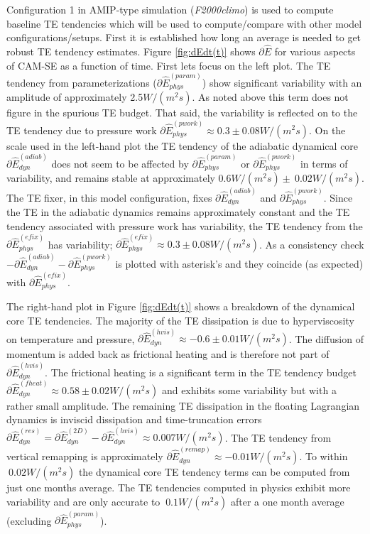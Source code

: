\documentclass{agujournal}
\newcommand*{\gi}[1]{\widehat{#1}}
\begin{document}
Configuration 1 in AMIP-type simulation ({\em{F2000climo}}) is used to compute baseline TE tendencies which will be used to compute/compare with other model configurations/setups. First it is established how long an average is needed to get robust TE tendency estimates. Figure \ref{fig:dEdt(t)} shows $\partial \gi{E}$ for various aspects of CAM-SE as a function of time. First lets focus on the left plot. The TE tendency from parameterizations ($\partial \gi{E}^{(param)}_{phys}$) show significant variability with an amplitude of approximately 2.5$W/(m^2s)$. As noted above this term does not figure in the spurious TE budget. That said, the variability is reflected on to the TE tendency due to pressure work $\partial \gi{E}^{(pwork)}_{phys}\approx 0.3\pm 0.08 W/(m^2s)$. On the scale used in the left-hand plot the TE tendency of the adiabatic dynamical core $\partial \gi{E}^{(adiab)}_{dyn}$ does not seem to be affected by $\partial \gi{E}^{(param)}_{phys}$ or $\partial \gi{E}^{(pwork)}_{phys}$ in terms of variability, and remains stable at approximately 0.6$W/(m^2s)\pm ~0.02 W/(m^2s)$. The TE fixer, in this model configuration, fixes $\partial \gi{E}^{(adiab)}_{dyn}$ and $\partial \gi{E}^{(pwork)}_{phys}$. Since the TE in the adiabatic dynamics remains approximately constant and the TE tendency associated with pressure work has variability, the TE tendency from the $\partial \gi{E}^{(efix)}_{phys}$ has variability; $\partial \gi{E}^{(efix)}_{phys}\approx 0.3 \pm 0.08 W/(m^2s)$. As a consistency check $-\partial \gi{E}^{(adiab)}_{dyn}-\partial \gi{E}^{(pwork)}_{phys}$ is plotted with asterisk's and they coincide (as expected) with $\partial \gi{E}^{(efix)}_{phys}$.

The right-hand plot in  Figure \ref{fig:dEdt(t)} shows a breakdown of the dynamical core TE tendencies. The majority of the TE dissipation is due to hyperviscosity on temperature and pressure, $\partial \gi{E}^{(hvis)}_{dyn}\approx -0.6\pm 0.01 W/(m^2s)$. The diffusion of momentum is added back as frictional heating and is therefore not part of $\partial \gi{E}^{(hvis)}_{dyn}$. The frictional heating is a significant term in the TE tendency budget $\partial \gi{E}^{(fheat)}_{dyn}\approx 0.58\pm 0.02 W/(m^2s)$ and exhibits some variability but with a rather small amplitude. The remaining TE dissipation in the floating Lagrangian dynamics is inviscid dissipation and time-truncation errors $\partial \gi{E}_{dyn}^{(res)}=\partial \gi{E}_{dyn}^{({2D})}-\partial \gi{E}_{dyn}^{({hvis})}\approx 0.007 W/(m^2s)$. The TE tendency from vertical remapping is approximately $\partial \gi{E}_{dyn}^{({remap})}\approx -0.01 W/(m^2s)$. To within $~0.02 W/(m^2s)$ the dynamical core TE tendency terms can be computed from just one months average. The TE tendencies computed in physics exhibit more variability and are only accurate to $~0.1 W/(m^2s)$ after a one month average (excluding $\partial \gi{E}^{(param)}_{phys}$). 
\end{document}
